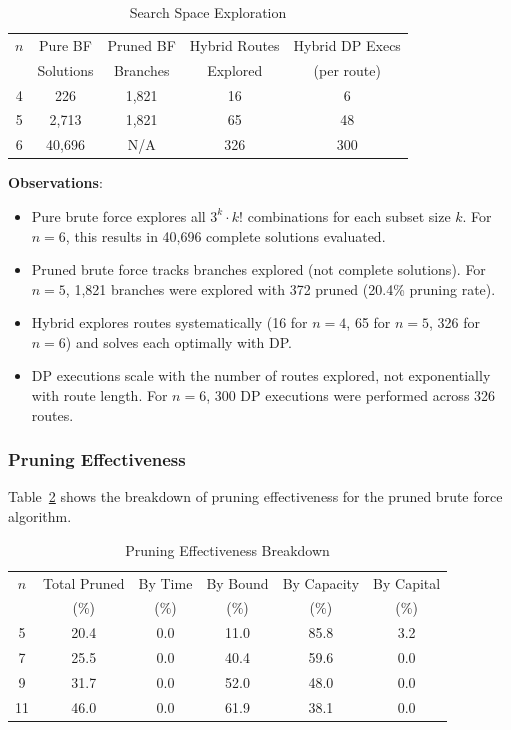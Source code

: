 \documentclass[12pt]{article}
\begin{document}
\begin{table}[h]
\centering
\caption{Search Space Exploration}
\label{tab:search_space}
\begin{tabular}{c|ccc|c}
\toprule
$n$ & Pure BF & Pruned BF & Hybrid Routes & Hybrid DP Execs \\
 & Solutions & Branches & Explored & (per route) \\
\midrule
4 & 226 & 1,821 & 16 & 6 \\
5 & 2,713 & 1,821 & 65 & 48 \\
6 & 40,696 & N/A & 326 & 300 \\
\bottomrule
\end{tabular}
\end{table}

\textbf{Observations}:
\begin{itemize}
    \item Pure brute force explores all $3^k \cdot k!$ combinations for each subset size $k$. For $n=6$, this results in 40,696 complete solutions evaluated.
    \item Pruned brute force tracks branches explored (not complete solutions). For $n=5$, 1,821 branches were explored with 372 pruned (20.4\% pruning rate).
    \item Hybrid explores routes systematically (16 for $n=4$, 65 for $n=5$, 326 for $n=6$) and solves each optimally with DP.
    \item DP executions scale with the number of routes explored, not exponentially with route length. For $n=6$, 300 DP executions were performed across 326 routes.
\end{itemize}

\subsubsection{Pruning Effectiveness}

Table~\ref{tab:pruning} shows the breakdown of pruning effectiveness for the pruned brute force algorithm.

\begin{table}[h]
\centering
\caption{Pruning Effectiveness Breakdown}
\label{tab:pruning}
\begin{tabular}{c|ccccc}
\toprule
$n$ & Total Pruned & By Time & By Bound & By Capacity & By Capital \\
 & (\%) & (\%) & (\%) & (\%) & (\%) \\
\midrule
5 & 20.4 & 0.0 & 11.0 & 85.8 & 3.2 \\
7 & 25.5 & 0.0 & 40.4 & 59.6 & 0.0 \\
9 & 31.7 & 0.0 & 52.0 & 48.0 & 0.0 \\
11 & 46.0 & 0.0 & 61.9 & 38.1 & 0.0 \\
\bottomrule
\end{tabular}
\end{table}
\end{document}
